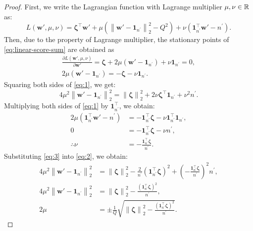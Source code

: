 \begin{proof}
	First, we write the Lagrangian function with Lagrange multiplier $\mu, \nu \in \mathbb{R}$ as:
	\begin{equation}
		L(\bm w', \mu, \nu) = \bm\zeta^\top \bm w' + \mu\left(\left\|\bm w'- \bm 1_{n ^\prime} \right\|_2^2 - Q^2\right) + \nu\left(\bm 1_{n ^\prime}^\top \bm w' - n^\prime\right).
	\end{equation}
	Then, due to the property of Lagrange multiplier, the stationary points of \eqref{eq:linear-score-sum} are obtained as
	\begin{gather}
		\frac{\partial L(\bm w', \mu, \nu)}{\partial \bm w'} = \bm\zeta + 2\mu\left(\bm w'- \bm 1_{n ^\prime} \right) + \nu\bm 1_{n ^\prime} = 0, \label{eq:0}\\
		2\mu\left(\bm w'- \bm 1_{n ^\prime} \right) = - \bm\zeta - \nu\bm 1_{n ^\prime} \label{eq:1}.
	\end{gather}
	Squaring both sides of \eqref{eq:1}, we get:
	\begin{equation}
		\label{eq:2}
		4\mu^2\left\|\bm w'- \bm 1_{n ^\prime} \right\|_2^2 = \left\|\bm\zeta\right\|_2^2 + 2\nu \bm\zeta^\top \bm 1_{n ^\prime} + \nu^2 n ^\prime.
	\end{equation}
	Multiplying both sides of \eqref{eq:1} by $\bm{1}_{n^\prime}^\top$, we obtain:
	\begin{align}
		2\mu\left(\bm 1_{n ^\prime}^\top \bm w'- n^\prime\right) & = - \bm 1_{n ^\prime}^\top \bm\zeta - \nu \bm 1_{n ^\prime}^\top \bm 1_{n ^\prime}, \nonumber\\
		0 & =  - \bm 1_{n ^\prime}^\top \bm\zeta - \nu n ^\prime, \nonumber\\
		\therefore \nu & = -\frac{\bm 1_{n ^\prime}^\top \bm\zeta}{n ^\prime}. \label{eq:3}
	\end{align}
	Substituting \eqref{eq:3} into \eqref{eq:2}, we obtain:
	\begin{align}
		4\mu^2\left\|\bm w'- \bm 1_{n ^\prime} \right\|_2^2 & = \left\|\bm\zeta\right\|_2^2 - \frac{2}{n ^\prime} \left(\bm 1_{n ^\prime}^\top \bm\zeta\right)^2 + \left(-\frac{\bm 1_{n ^\prime}^\top \bm\zeta}{n ^\prime}\right)^2 n ^\prime, \nonumber\\
		4\mu^2\left\|\bm w'- \bm 1_{n ^\prime} \right\|_2^2 & = \left\|\bm\zeta\right\|_2^2 - \frac{\left(\bm 1_{n ^\prime}^\top \bm\zeta\right)^2}{n ^\prime}, \nonumber\\
		2\mu & = \pm \frac{1}{Q}\sqrt{\left\|\bm\zeta\right\|_2^2 - \frac{\left(\bm 1_{n ^\prime}^\top \bm\zeta\right)^2}{n ^\prime}}. \label{eq:4}
	\end{align}

\end{proof}
